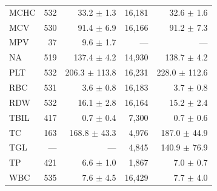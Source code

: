 \begin{table}[ht]
\begin{tabular}{lrrrr}
MCHC & 532 & 33.2 $\pm$ 1.3 & 16,181 & 32.6 $\pm$ 1.6 \\
MCV & 530 & 91.4 $\pm$ 6.9 & 16,166 & 91.2 $\pm$ 7.3 \\
MPV & 37 & 9.6 $\pm$ 1.7 & --- & --- \\
NA & 519 & 137.4 $\pm$ 4.2 & 14,930 & 138.7 $\pm$ 4.2 \\
PLT & 532 & 206.3 $\pm$ 113.8 & 16,231 & 228.0 $\pm$ 112.6 \\
RBC & 531 & 3.6 $\pm$ 0.8 & 16,183 & 3.7 $\pm$ 0.8 \\
RDW & 532 & 16.1 $\pm$ 2.8 & 16,164 & 15.2 $\pm$ 2.4 \\
TBIL & 417 & 0.7 $\pm$ 0.4 & 7,300 & 0.7 $\pm$ 0.6 \\
TC & 163 & 168.8 $\pm$ 43.3 & 4,976 & 187.0 $\pm$ 44.9 \\
TGL & --- & --- & 4,845 & 140.9 $\pm$ 76.9 \\
TP & 421 & 6.6 $\pm$ 1.0 & 1,867 & 7.0 $\pm$ 0.7 \\
WBC & 535 & 7.6 $\pm$ 4.5 & 16,429 & 7.7 $\pm$ 4.0 \\
\bottomrule
\end{tabular}
\label{tab:03_cohort_val}
\end{table}